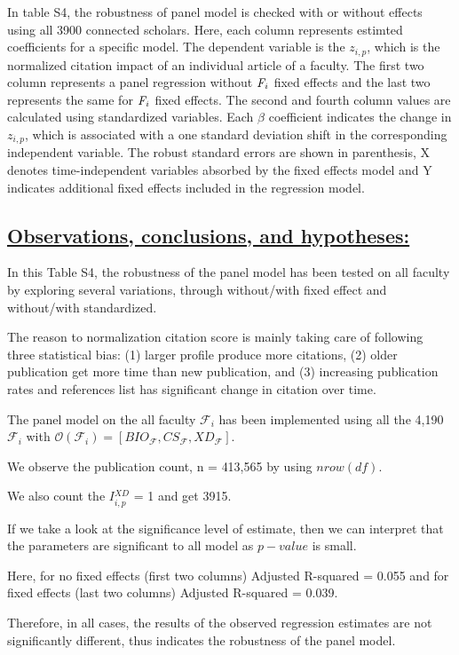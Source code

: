 \documentclass{article}\usepackage[]{graphicx}\usepackage[]{color}
\begin{document}
{In table S4, the robustness of panel model is checked with or without effects using all 3900 connected scholars. Here, each column represents estimted coefficients for a specific model. The dependent variable is the $z{_{i,p}}$, which is the normalized citation impact of an individual article of a faculty. The first two column represents a panel regression without ${{\it{F}}_i}$ fixed effects and the last two represents the same for ${{\it{F}}_i}$ fixed effects. The second and fourth column values are calculated using standardized variables. Each $\beta$ coefficient indicates the change in $z{_{i,p}}$, which is associated with a one standard deviation shift in the corresponding independent variable. The robust standard errors are shown in parenthesis, X denotes time-independent variables absorbed by the fixed effects model and Y indicates additional fixed effects included in the regression model. 
}

\subsection*{\underline{Observations, conclusions, and hypotheses:}}
\begin{description}
  \item
  \item In this Table S4, the robustness of the panel model has been tested on all faculty by exploring several variations, through without/with fixed effect and without/with standardized.
  \item[$\bullet$] The reason to normalization citation score is mainly taking care of following three statistical bias: (1) larger profile produce more citations, (2) older publication get more time than new publication, and (3) increasing publication rates and references list has significant change in citation over time.
  \item[$\bullet$] The panel model on the all faculty $\mathcal{F}_i$ has been implemented using all the 4,190 $\mathcal{F}_i$ with $\mathscr{O}(\mathcal{F}_i) = [BIO_\mathcal{F},CS_\mathcal{F},XD_\mathcal{F}]$.
  \item[$\bullet$] We observe the publication count, n = 413,565 by using $nrow(df)$.
  \item[$\bullet$] We also count the $I{^{XD}_{i,p}}$ = 1 and get 3915.
  \item[$\bullet$] If we take a look at the significance level of estimate, then we can interpret that the parameters are significant to all model as $p-value$ is small. 
    \item[$\bullet$] Here, for no fixed effects (first two columns) Adjusted R-squared = 0.055 and for fixed effects (last two columns) Adjusted R-squared = 0.039.
  \item Therefore, in all cases, the results of the observed regression estimates are not significantly different, thus indicates the robustness of the panel model.
\end{description}
\end{document}
